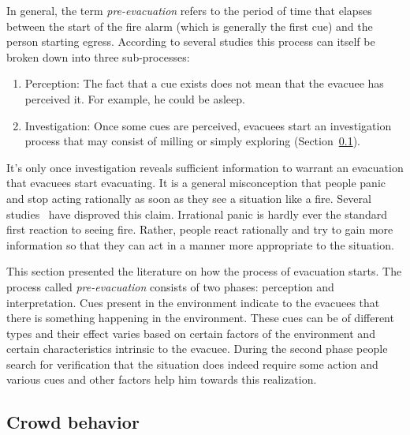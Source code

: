 In general, the term \emph{pre-evacuation} refers to the period of time that elapses between the start of the fire alarm (which is generally the first cue) and the person starting egress. According to several studies this process can itself be broken down into three sub-processes:

\begin{enumerate}
	\item Perception: The fact that a cue exists does not mean that the evacuee has perceived it. For example, he could be asleep.
	\item Investigation: Once some cues are perceived, evacuees start an investigation process that may consist of milling or simply exploring (Section~\ref{LiteratureReview:CrowdBehavior}).
\end{enumerate}

It's only once investigation reveals sufficient information to warrant an evacuation that evacuees start evacuating. It is a general misconception that people panic and stop acting rationally as soon as they see a situation like a fire. Several studies~\cite{Kobes:2009jx,Schadschneider:2008cz,Reicher:2008ep,Torres:2010tj,Paulsen:1984ti,Sime:1983uy} have disproved this claim. Irrational panic is hardly ever the standard first reaction to seeing fire. Rather, people react rationally and try to gain more information so that they can act in a manner more appropriate to the situation.

This section presented the literature on how the process of evacuation starts. The process called \emph{pre-evacuation} consists of two phases: perception and interpretation. Cues present in the environment indicate to the evacuees that there is something happening in the environment. These cues can be of different types and their effect varies based on certain factors of the environment and certain characteristics intrinsic to the evacuee. During the second phase people search for verification that the situation does indeed require some action and various cues and other factors help him towards this realization.  %

\subsection{Crowd behavior}
\label{LiteratureReview:CrowdBehavior}


